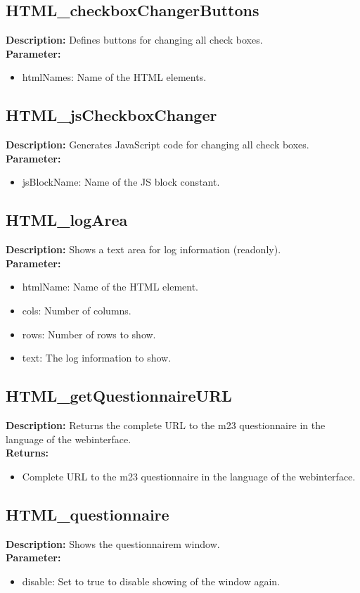 \subsection{HTML\_checkboxChangerButtons}
\textbf{Description:} Defines buttons for changing all check boxes.\\
\textbf{Parameter:}
\begin{itemize}
\item htmlNames: Name of the HTML elements.
\end{itemize}

\subsection{HTML\_jsCheckboxChanger}
\textbf{Description:} Generates JavaScript code for changing all check boxes.\\
\textbf{Parameter:}
\begin{itemize}
\item jsBlockName: Name of the JS block constant.
\end{itemize}

\subsection{HTML\_logArea}
\textbf{Description:} Shows a text area for log information (readonly).\\
\textbf{Parameter:}
\begin{itemize}
\item htmlName: Name of the HTML element.
\item cols: Number of columns.
\item rows: Number of rows to show.
\item text: The log information to show.
\end{itemize}

\subsection{HTML\_getQuestionnaireURL}
\textbf{Description:} Returns the complete URL to the m23 questionnaire in the language of the webinterface.\\
\textbf{Returns:}
\begin{itemize}
\item Complete URL to the m23 questionnaire in the language of the webinterface.
\end{itemize}

\subsection{HTML\_questionnaire}
\textbf{Description:} Shows the questionnairem window.\\
\textbf{Parameter:}
\begin{itemize}
\item disable: Set to true to disable showing of the window again.
\end{itemize}

